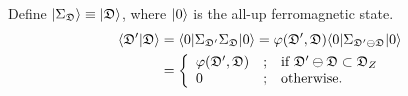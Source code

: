 Define $| \Sigma_\mathfrak{D} \rangle \equiv | \mathfrak{D} \rangle$, where $| 0 \rangle$ is the all-up ferromagnetic state. 
\begin{align}\label{eq:string-overlap}
    \langle \mathfrak{D}' | \mathfrak{D} \rangle
    &=
    \langle 0 |\Sigma_{\mathfrak{D}'}\Sigma_{\mathfrak{D}}| 0 \rangle
    =
    \varphi(\mathfrak{D}',\mathfrak{D}) 
    \langle 0 |\Sigma_{\mathfrak{D}'\ominus\mathfrak{D}}| 0 \rangle \nonumber \\
    &=
    \left\{
    \begin{array}{lll}
        \varphi(\mathfrak{D}',\mathfrak{D}) & ; & \text{if $\mathfrak{D}'\ominus\mathfrak{D} \subset \mathfrak{D}_{Z}$}\\
        0 & ; & \text{otherwise.}
    \end{array}
    \right.
\end{align}